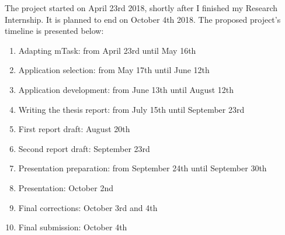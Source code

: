 \documentclass{article}
\begin{document}
The project started on April 23rd 2018, shortly after I finished my Research Internship. It is planned to end on October 4th 2018. The proposed project's timeline is presented below:

\begin{enumerate}
    \item Adapting mTask: from April 23rd until May 16th
    \item Application selection: from May 17th until June 12th 
    \item Application development: from June 13th until August 12th
    \item Writing the thesis report: from July 15th until September 23rd
    \item First report draft: August 20th
    \item Second report draft: September 23rd
    \item Presentation preparation: from September 24th until September 30th
    \item Presentation: October 2nd
    \item Final corrections: October 3rd and 4th
    \item Final submission: October 4th
\end{enumerate}

\clearpage

\printglossary[type=\acronymtype]
\end{document}

